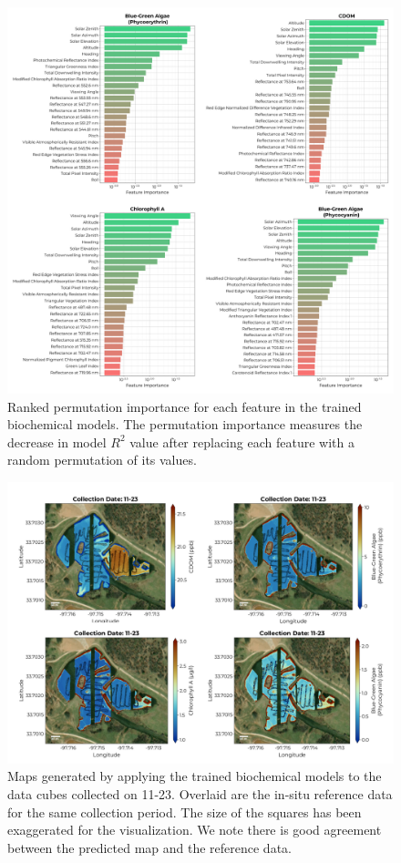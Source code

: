 \documentclass[remotesensing,article,submit,pdftex,moreauthors]{Definitions/mdpi}
\begin{document}
\begin{figure}
\centering
\includegraphics[width=\columnwidth]{paper/figures/results/fits/biochemical-ranking.pdf}
\caption{Ranked permutation importance for each feature in the trained biochemical models. The permutation importance measures the decrease in model $R^2$ value after replacing each feature with a random permutation of its values.\label{fig:biochem-fi}}
\end{figure}  

\begin{figure}
\centering
\vspace{-0.3in}
\includegraphics[width=\columnwidth]{paper/figures/results/maps/biochemical.pdf}
\vspace{-0.2in}
\caption{Maps generated by applying the trained biochemical models to the data cubes collected on 11-23. Overlaid are the in-situ reference data for the same collection period. The size of the squares has been exaggerated for the visualization. We note there is good agreement between the predicted map and the reference data. \label{fig:map-biochem}}
\end{figure}  
\end{document}
